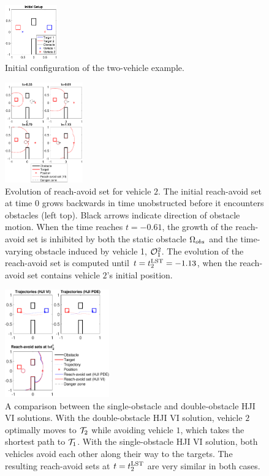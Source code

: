 \begin{figure}
	\centering
	\includegraphics[width=0.2\textwidth]{"fig/kin_ic"}
	\caption{Initial configuration of the two-vehicle example.}
	\label{fig:kin_ic}
\end{figure}

\begin{figure}
	\centering
	\includegraphics[width=0.3\textwidth]{"fig/kin_reach"}
	\caption{Evolution of reach-avoid set for vehicle $2$. The initial reach-avoid set at time 0 grows backwards in time unobstructed before it encounters obstacles (left top). Black arrows indicate direction of obstacle motion. When the time reaches $t=-0.61$, the growth of the reach-avoid set is inhibited by both the static obstacle $\Omega_{obs}$ and the time-varying obstacle induced by vehicle 1, $\mathcal{O}_1^2$. The evolution of the reach-avoid set is computed until $t=t^{\text{LST}}_2=-1.13$, when the reach-avoid set contains vehicle $2$'s initial position.}
	\label{fig:kin_reach}
\end{figure}

\begin{figure}
	\centering
	\includegraphics[width=0.4\textwidth]{"fig/kin_result"}
	\caption{A comparison between the single-obstacle and double-obstacle HJI VI solutions. With the double-obstacle HJI VI solution, vehicle $2$ optimally moves to $\mathcal{T}_2$ while avoiding vehicle $1$, which takes the shortest path to $\mathcal{T}_1$. With the single-obstacle HJI VI solution, both vehicles avoid each other along their way to the targets. The resulting reach-avoid sets at $t=t^{\text{LST}}_2$ are very similar in both cases.}
	\label{fig:kin_result}
\end{figure}

